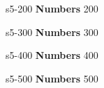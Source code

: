 \documentclass{beamer}
\def \fifthcat {\textbf{Numbers}}
\begin{document}
	
	\content                       
	{s5-200}                     
	{\fifthcat}                          
	{200}{   
		
	}
	
	
	\content           
	{s5-300}                     
	{\fifthcat}                          
	{300}{     
		
	}
	
	
	\content                       
	{s5-400}                     
	{\fifthcat}                          
	{400}{ 
		
	}
	
	
	\content                       
	{s5-500}                     
	{\fifthcat}                          
	{500}{   
		
	}
\end{document}
